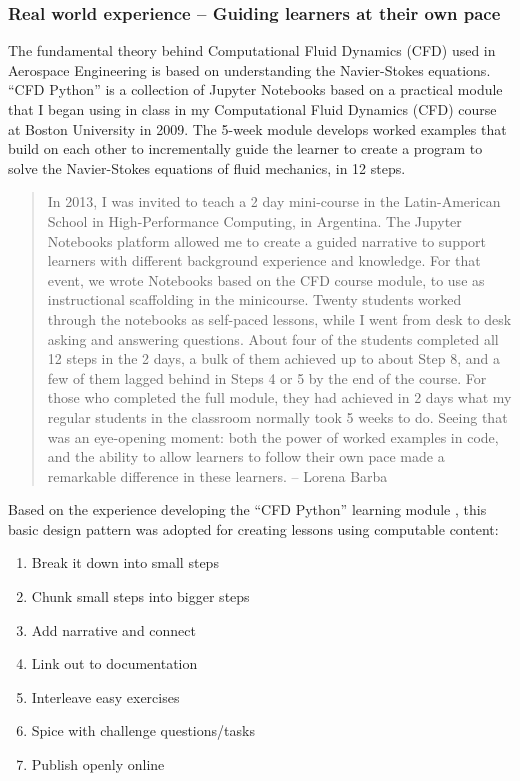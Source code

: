 \documentclass[]{book}
\providecommand{\tightlist}{%
  \setlength{\itemsep}{0pt}\setlength{\parskip}{0pt}}
\begin{document}
\subsubsection{Real world experience -- Guiding learners at their own
pace}\label{real-world-experience-guiding-learners-at-their-own-pace}

The fundamental theory behind Computational Fluid Dynamics (CFD) used in
Aerospace Engineering is based on understanding the Navier-Stokes
equations. ``CFD Python'' is a collection of Jupyter Notebooks based on
a practical module that I began using in class in my Computational Fluid
Dynamics (CFD) course at Boston University in 2009. The 5-week module
develops worked examples that build on each other to incrementally guide
the learner to create a program to solve the Navier-Stokes equations of
fluid mechanics, in 12 steps.

\begin{quote}
In 2013, I was invited to teach a 2 day mini-course in the
Latin-American School in High-Performance Computing, in Argentina. The
Jupyter Notebooks platform allowed me to create a guided narrative to
support learners with different background experience and knowledge. For
that event, we wrote Notebooks based on the CFD course module, to use as
instructional scaffolding in the minicourse. Twenty students worked
through the notebooks as self-paced lessons, while I went from desk to
desk asking and answering questions. About four of the students
completed all 12 steps in the 2 days, a bulk of them achieved up to
about Step 8, and a few of them lagged behind in Steps 4 or 5 by the end
of the course. For those who completed the full module, they had
achieved in 2 days what my regular students in the classroom normally
took 5 weeks to do. Seeing that was an eye-opening moment: both the
power of worked examples in code, and the ability to allow learners to
follow their own pace made a remarkable difference in these learners. --
Lorena Barba
\end{quote}

Based on the experience developing the ``CFD Python'' learning module
\citep{barbacfd}, this basic design pattern was adopted for creating
lessons using computable content:

\begin{enumerate}
\def\labelenumi{\arabic{enumi}.}
\tightlist
\item
  Break it down into small steps
\item
  Chunk small steps into bigger steps
\item
  Add narrative and connect
\item
  Link out to documentation
\item
  Interleave easy exercises
\item
  Spice with challenge questions/tasks
\item
  Publish openly online
\end{enumerate}
\end{document}
